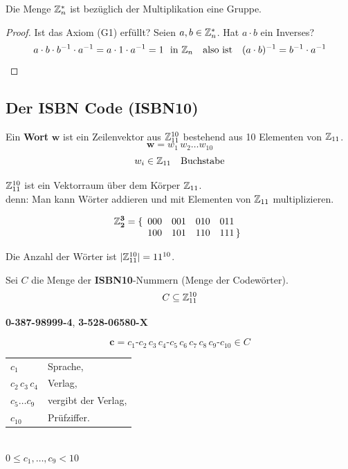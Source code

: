 \begin{satz}
Die Menge $\mathbb{Z}_{n}^*$ ist bezüglich der Multiplikation eine Gruppe.
\end{satz}

\begin{proof}
Ist das Axiom (G1) erfüllt? Seien $a, b \in \mathbb{Z}_{n}^*$. Hat $a \cdot b$ ein Inverses?
\[ a \cdot b \cdot b^{-1} \cdot a^{-1} = a \cdot 1 \cdot a^{-1} = 1 \ \text{ in } \mathbb{Z}_{n} \quad \text{also ist} \quad (a \cdot b)^{-1} = b^{-1} \cdot a^{-1} \qedhere \]
\end{proof}

\subsection{Der ISBN Code (ISBN10)}

\begin{definition}[Wort]
Ein \textbf{Wort} $\boldsymbol{w}$ ist ein Zeilenvektor aus $\mathbb{Z}_{11}^{10}$ bestehend aus 10 Elementen von $\mathbb{Z}_{11}$.
\[ \boldsymbol{w} = w_1\, w_2 \ldots w_{10} \]
\[ w_i \in \mathbb{Z}_{11} \quad \text{Buchstabe} \]
\end{definition}

$\mathbb{Z}_{11}^{10}$ ist ein Vektorraum über dem Körper $\mathbb{Z}_{11}$.\\
denn: Man kann Wörter addieren und mit Elementen von $\mathbb{Z}_{11}$ multiplizieren.

\begin{beispiel}
\[ \boldsymbol{\mathbb{Z}_{2}^3} = \{ \begin{array}[t]{llll} 000 & 001 & 010 & 011 \\ 100 & 101 & 110 & 111 \,\} \end{array} \]
\end{beispiel}

\begin{satz}
Die Anzahl der Wörter ist $|\mathbb{Z}_{11}^{10}| = 11^{10}$.
\end{satz}

Sei $C$ die Menge der \textbf{ISBN10}-Nummern (Menge der Codewörter).
\[ C \subseteq \mathbb{Z}_{11}^{10} \]

\begin{beispiel}
\textbf{0-387-98999-4}, \quad \textbf{3-528-06580-$\boldsymbol{X}$}
\end{beispiel}

\[ \boldsymbol{c} = c_1\text{-}c_2\, c_3\, c_4\text{-}c_5\, c_6\, c_7\, c_8\, c_9\text{-}c_{10} \in C \]
\begin{tabular}{ll}
$c_1$ & Sprache, \\
$c_2\, c_3\, c_4$ & Verlag, \\
$c_5 \ldots c_9$ & vergibt der Verlag, \\
$c_{10}$ & Prüfziffer.
\end{tabular}\\
$0 \leq c_1, \ldots, c_9 < 10$

